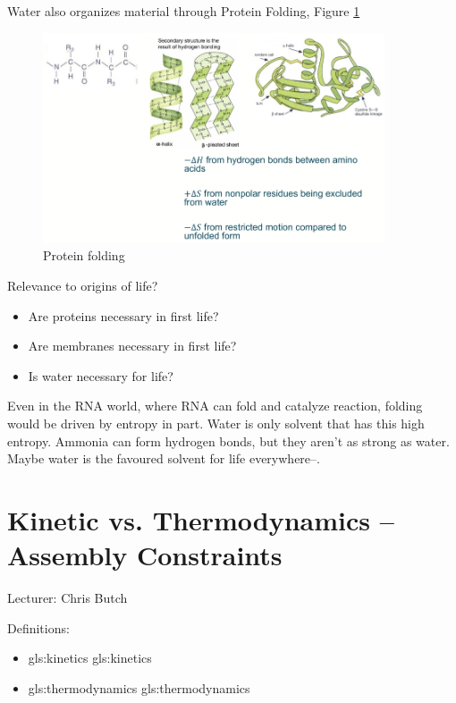 \documentclass[]{article}
\begin{document}
Water also organizes material through Protein Folding, Figure \ref{fig:ProteinFolding} 
\begin{figure}[H]
	\caption{Protein folding} \label{fig:ProteinFolding} 
	\includegraphics[width=0.9\textwidth]{ProteinFolding}
\end{figure}

 Relevance to origins of life?
\begin{itemize}
	\item Are proteins necessary in first life?
	\item Are membranes necessary in first life?
	\item Is water necessary for life?
\end{itemize}

Even in the RNA world, where RNA can fold and catalyze reaction, folding would be driven by entropy in part. Water is only solvent that has this high entropy. Ammonia can form hydrogen bonds, but they aren't as strong as water. Maybe water is the favoured solvent for life everywhere--\cite{ball2017water}.

\section{Kinetic vs. Thermodynamics – Assembly Constraints}

Lecturer: Chris Butch

Definitions:

\begin{itemize}
	\item \gls{gls:kinetics}  \glsdesc{gls:kinetics}
	\item \gls{gls:thermodynamics} \glsdesc{gls:thermodynamics}
\end{itemize}
\end{document}
